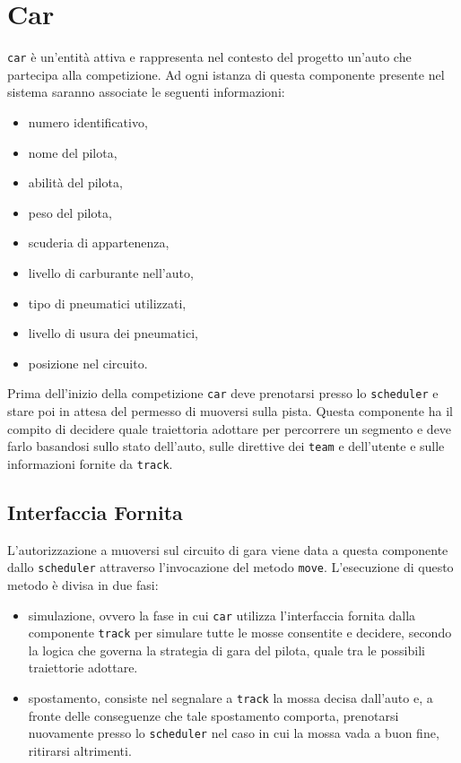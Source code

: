 \documentclass[a4paper]{report}
\newcommand{\fun}[1]{\texttt{#1}}
\begin{document}
\section{Car}
\texttt{car} è un'entità attiva e rappresenta nel contesto del progetto un'auto che partecipa alla competizione. Ad ogni istanza di questa componente presente nel sistema saranno associate le seguenti informazioni:
\begin{itemize}
\item numero identificativo,
\item nome del pilota,
\item abilità del pilota,
\item peso del pilota,
\item scuderia di appartenenza,
\item livello di carburante nell'auto,
\item tipo di pneumatici utilizzati,
\item livello di usura dei pneumatici,
\item posizione nel circuito.
\end{itemize}
Prima dell'inizio della competizione \texttt{car} deve prenotarsi presso lo \texttt{scheduler} e stare poi in attesa del permesso di muoversi sulla pista.
Questa componente ha il compito di decidere quale traiettoria adottare per percorrere un segmento e deve farlo basandosi sullo stato dell'auto, sulle direttive dei \texttt{team} e dell'utente e sulle informazioni fornite da \texttt{track}.

\subsection*{Interfaccia Fornita}
L'autorizzazione a muoversi sul circuito di gara viene data a questa componente dallo \texttt{scheduler} attraverso l'invocazione del metodo \fun{move}. L'esecuzione di questo metodo è divisa in due fasi:
\begin{itemize}
\item simulazione, ovvero la fase in cui \texttt{car} utilizza l'interfaccia fornita dalla componente \texttt{track} per simulare tutte le mosse consentite e decidere, secondo la logica che governa la strategia di gara del pilota, quale tra le possibili traiettorie adottare.
\item spostamento, consiste nel segnalare a \texttt{track} la mossa decisa dall'auto e, a fronte delle conseguenze che tale spostamento comporta, prenotarsi nuovamente presso lo \texttt{scheduler} nel caso in cui la mossa vada a buon fine, ritirarsi altrimenti.
\end{itemize}
\end{document}
